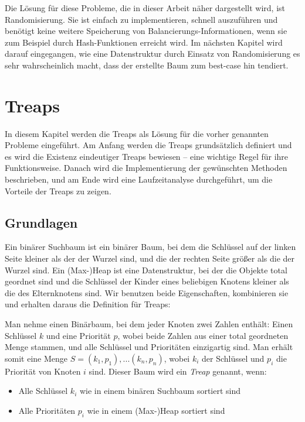 \documentclass[a4paper]{scrreprt}
\theoremstyle{definition}
\begin{document}
Die Lösung für diese Probleme, die in dieser Arbeit näher dargestellt wird, ist Randomisierung.
Sie ist einfach zu implementieren, schnell auszuführen und benötigt keine weitere Speicherung von Balancierungs-Informationen, wenn sie zum Beispiel durch Hash-Funktionen erreicht wird.
Im nächsten Kapitel wird darauf eingegangen, wie eine Datenstruktur durch Einsatz von Randomisierung es sehr wahrscheinlich macht, dass der erstellte Baum zum best-case hin tendiert. 


\chapter{Treaps}
\label{sec:treaps}

In diesem Kapitel werden die Treaps als Lösung für die vorher genannten Probleme eingeführt.
Am Anfang werden die Treaps grundsätzlich definiert und es wird die Existenz eindeutiger Treaps bewiesen -- eine wichtige Regel für ihre Funktionsweise.
Danach wird die Implementierung der gewünschten Methoden beschrieben, und am Ende wird eine Laufzeitanalyse durchgeführt, um die Vorteile der Treaps zu zeigen.

\section{Grundlagen}
\label{sec:treapsbasics}

Ein binärer Suchbaum ist ein binärer Baum, bei dem die Schlüssel auf der linken Seite kleiner als der der Wurzel sind, und die der rechten Seite größer als die der Wurzel sind.
Ein (Max-)Heap ist eine Datenstruktur, bei der die Objekte total geordnet sind und die Schlüssel der Kinder eines beliebigen Knotens kleiner als die des Elternknotens sind.
Wir benutzen beide Eigenschaften, kombinieren sie und erhalten daraus die Definition für Treaps:

Man nehme einen Binärbaum, bei dem jeder Knoten zwei Zahlen enthält: Einen Schlüssel $k$ und eine Priorität $p$, wobei beide Zahlen aus einer total geordneten Menge stammen, und alle Schlüssel und Prioritäten einzigartig sind. Man erhält somit eine Menge $S = {(k_1, p_1), ... (k_n, p_n)}$, wobei $k_i$ der Schlüssel und $p_i$ die Priorität von Knoten $i$ sind. Dieser Baum wird ein \emph{Treap} genannt, wenn:

\begin{itemize}
\item Alle Schlüssel $k_i$ wie in einem binären Suchbaum sortiert sind
\item Alle Prioritäten $p_i$ wie in einem (Max-)Heap sortiert sind
\end{itemize}
\end{document}
